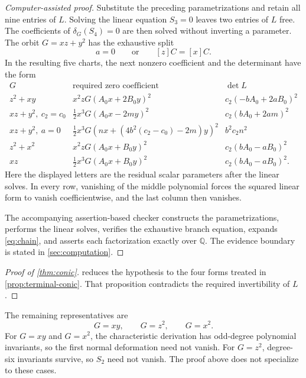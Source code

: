 \documentclass[11pt,reqno]{amsart}
\begin{document}
\begin{proof}[Computer-assisted proof]
Substitute the preceding parametrizations and retain all nine entries of
\(L\).  Solving the linear equation \(S_3=0\) leaves two entries of \(L\)
free.  The coefficients of \(\delta_G(S_4)=0\) are then solved without
inverting a parameter.  The orbit \(G=xz+y^2\) has the exhaustive split
\[
a=0\qquad\text{or}\qquad [z]C=[x]C.
\]
In the resulting five charts, the next nonzero coefficient and the
determinant have the form
\[
\begin{array}{c|c|c}
G&\text{required zero coefficient}&\det L\\ \hline
z^2+xy&
x^2zG(A_0x+2B_0y)^2&
c_2(-bA_0+2aB_0)^2\\
xz+y^2,\ c_2=c_0&
\frac12x^3G(A_0x-2my)^2&
c_2(bA_0+2am)^2\\
xz+y^2,\ a=0&
\frac12x^3G(nx+(4b^2(c_2-c_0)-2m)y)^2&
b^2c_2n^2\\
z^2+x^2&
x^2zG(A_0x+B_0y)^2&
c_2(bA_0-aB_0)^2\\
xz&
\frac12x^3G(A_0x+B_0y)^2&
c_2(bA_0-aB_0)^2.
\end{array}
\]
Here the displayed letters are the residual scalar parameters after the
linear solves.  In every row, vanishing of the middle polynomial forces the
squared linear form to vanish coefficientwise, and the last column then
vanishes.

The accompanying assertion-based checker constructs the parametrizations,
performs the linear solves, verifies the exhaustive branch equation, expands
\eqref{eq:chain}, and asserts each factorization exactly over \(\mathbb Q\).
The evidence boundary is stated in
\cref{sec:computation}.
\end{proof}

\begin{proof}[Proof of \cref{thm:conic}]
 reduces the hypothesis to the four forms treated in
\cref{prop:terminal-conic}.  That proposition contradicts the required
invertibility of \(L\).
\end{proof}

\begin{remark}
The remaining representatives are
\[
G=xy,\qquad G=z^2,\qquad G=x^2.
\]
For \(G=xy\) and \(G=x^2\), the characteristic derivation has odd-degree
polynomial invariants, so the first normal deformation need not vanish.  For
\(G=z^2\), degree-six invariants survive, so \(S_2\) need not vanish.
The proof above does not specialize to these cases.
\end{remark}
\end{document}
